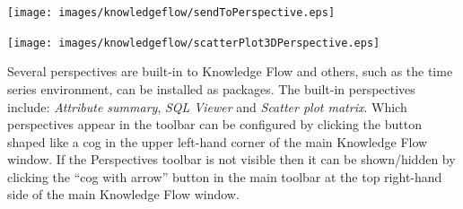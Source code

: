 \begin{center}
  \texttt{[image: images/knowledgeflow/sendToPerspective.eps]}
\end{center}

\begin{center}
  \texttt{[image: images/knowledgeflow/scatterPlot3DPerspective.eps]}
\end{center}

Several perspectives are built-in to Knowledge Flow and others, such
as the time series environment, can be installed as packages. The
built-in perspectives include: \textit{Attribute summary}, \textit{SQL
  Viewer} and \textit{Scatter plot matrix}. Which perspectives appear
in the toolbar can be configured by clicking the button shaped like a
cog in the upper left-hand corner of the main Knowledge Flow
window. If the Perspectives toolbar is not visible then it can be
shown/hidden by clicking the ``cog with arrow'' button in the main
toolbar at the top right-hand side of the main Knowledge Flow window.
